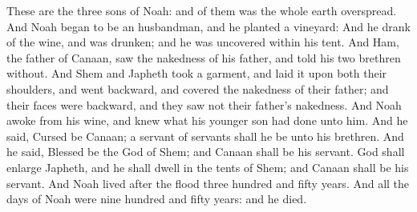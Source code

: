\begin{biblechapter}
\verse These are the three sons of Noah: and of them was the whole earth overspread.
\verse And Noah began to be an husbandman, and he planted a vineyard:
\verse And he drank of the wine, and was drunken; and he was uncovered within his tent.
\verse And Ham, the father of Canaan, saw the nakedness of his father, and told his two brethren without.
\verse And Shem and Japheth took a garment, and laid it upon both their shoulders, and went backward, and covered the nakedness of their father; and their faces were backward, and they saw not their father's nakedness.
\verse And Noah awoke from his wine, and knew what his younger son had done unto him.
\verse And he said, Cursed be Canaan; a servant of servants shall he be unto his brethren.
\verse And he said, Blessed be the \LORD God of Shem; and Canaan shall be his servant.
\verse God shall enlarge Japheth, and he shall dwell in the tents of Shem; and Canaan shall be his servant.
\verse And Noah lived after the flood three hundred and fifty years.
\verse And all the days of Noah were nine hundred and fifty years: and he died.
\end{biblechapter}

